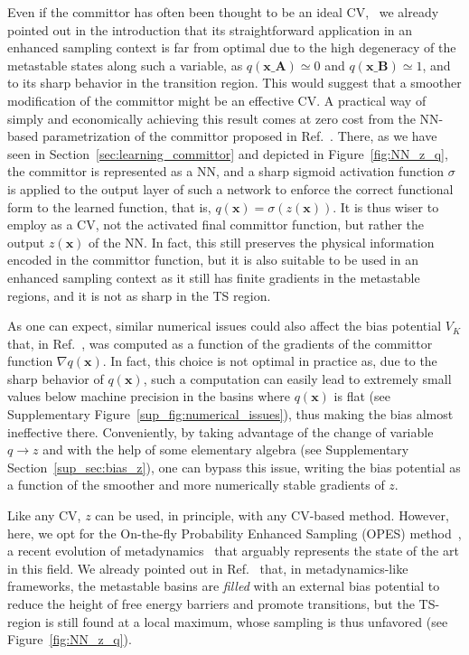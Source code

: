         Even if the committor has often been thought to be an ideal CV,~\cite{berezhkovskii2005one,li2014recent,ma2005automatic,he2022committor} we already pointed out in the introduction that its straightforward application in an enhanced sampling context is far from optimal due to the high degeneracy of the metastable states along such a variable, as $q(\textbf{x_A})\simeq0$ and $q(\textbf{x_B})\simeq1$, and to its sharp behavior in the transition region.
        This would suggest that a smoother modification of the committor might be an effective CV.
        A practical way of simply and economically achieving this result comes at zero cost from the NN-based parametrization of the committor proposed in Ref.~.
        There, as we have seen in Section~\ref{sec:learning_committor} and depicted in Figure~\ref{fig:NN_z_q}, the committor is represented as a NN, and a sharp sigmoid activation function $\sigma$ is applied to the output layer of such a network to enforce the correct functional form to the learned function, that is, $q(\textbf{x}) = \sigma(z(\textbf{x}))$.
        It is thus wiser to employ as a CV, not the activated final committor function, but rather the output $z(\textbf{x})$ of the NN.
        In fact, this still preserves the physical information encoded in the committor function, but it is also suitable to be used in an enhanced sampling context as it still has finite gradients in the metastable regions, and it is not as sharp in the TS region.

        As one can expect, similar numerical issues could also affect the bias potential $V_{K}$ that, in Ref.~, was computed as a function of the gradients of the committor function $\nabla q(\textbf{x})$.
        In fact, this choice is not optimal in practice as, due to the sharp behavior of $q(\textbf{x})$, such a computation can easily lead to extremely small values below machine precision in the basins where $q(\textbf{x})$ is flat (see Supplementary Figure~\ref{sup_fig:numerical_issues}), thus making the bias almost ineffective there.
        Conveniently, by taking advantage of the change of variable $q \rightarrow z$ and with the help of some elementary algebra (see Supplementary Section~\ref{sup_sec:bias_z}), one can bypass this issue, writing the bias potential as a function of the smoother and more numerically stable gradients of $z$.
       
        Like any CV, $z$ can be used, in principle, with any CV-based method. 
        However, here, we opt for the On-the-fly Probability Enhanced Sampling (OPES) method~\cite{invernizzi2020rethinking, trizio2024advanced}, a recent evolution of metadynamics~\cite{laio2002escaping} that arguably represents the state of the art in this field.
        We already pointed out in Ref.~ that, in metadynamics-like frameworks, the metastable basins are \emph{filled} with an external bias potential to reduce the height of free energy barriers and promote transitions, but the TS-region is still found at a local maximum, whose sampling is thus unfavored (see Figure~\ref{fig:NN_z_q}).
        
